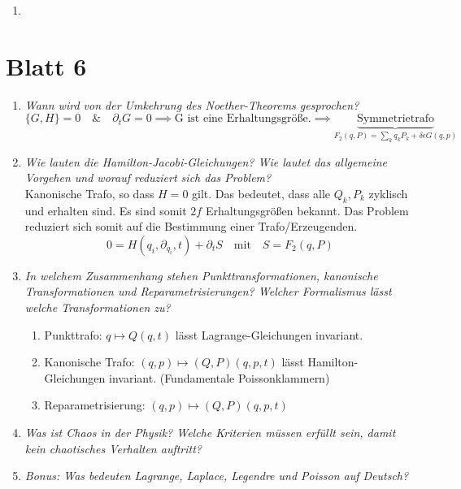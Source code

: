 \begin{enumerate}
    \item 
\end{enumerate}


\newpage

\section*{Blatt 6}
\begin{enumerate}
    \item \textit{Wann wird von der Umkehrung des Noether-Theorems gesprochen?} \\
        \begin{equation*}
            \{G,H\}=0 \quad \& \quad \partial_t G =0 \implies \text{G ist eine Erhaltungsgröße.} \implies \underbrace{\text{Symmetrietrafo}}_{F_2(q,P)= \sum_k q_k P_k + \delta \epsilon G(q,p)}
        \end{equation*}
    \item \textit{Wie lauten die Hamilton-Jacobi-Gleichungen? Wie lautet das allgemeine Vorgehen und worauf reduziert sich das Problem?} \\
        Kanonische Trafo, so dass $H=0$ gilt. Das bedeutet, dass alle $Q_k, P_k$ zyklisch und erhalten sind. Es sind somit $2f$ Erhaltungsgrößen bekannt. Das Problem reduziert sich somit auf die Bestimmung einer Trafo/Erzeugenden.
        \begin{equation*}
            0=H(q_i, \partial_{q_i}, t)+\partial_t S \quad \text{mit} \quad S=F_2(q, P)
        \end{equation*}
    \item \textit{In welchem Zusammenhang stehen Punkttransformationen, kanonische Transformationen und Reparametrisierungen? Welcher Formalismus lässt welche Transformationen zu?} \\
    \begin{enumerate}
        \item Punkttrafo: $q \mapsto Q(q,t) $ lässt Lagrange-Gleichungen invariant.
        \item Kanonische Trafo: $(q,p) \mapsto (Q,P)(q,p,t)$ lässt Hamilton-Gleichungen invariant. (Fundamentale Poissonklammern)
        \item Reparametrisierung: $(q,p) \mapsto (Q,P)(q,p,t)$
    \end{enumerate}
    \item \textit{Was ist Chaos in der Physik? Welche Kriterien müssen erfüllt sein, damit kein chaotisches Verhalten auftritt?} \\
    \item \textit{Bonus: Was bedeuten Lagrange, Laplace, Legendre und Poisson auf Deutsch?} \\
\end{enumerate}
